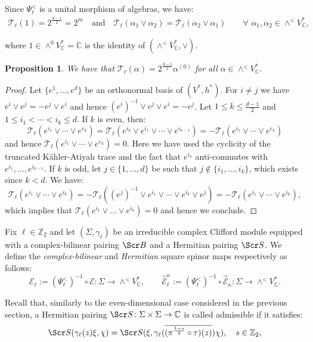 \documentclass[10pt,a4paper,twoside,reqno]{amsart}
\theoremstyle{plain}
\newtheorem{prop}[thm]{Proposition}
\theoremstyle{definition}
\theoremstyle{remark}
\def\C{\mathbb{C}}
\def\scB{\Scr B}
\def\scS{\Scr S}
\def\cE{\mathcal{E}}
\def\hcE{\widehat{\mathcal{E}}}
\begin{document}
\noindent 
Since $\Psi^<_\ell$ is a unital morphism of algebras, we have: 
\begin{eqnarray*}
\mathcal{T}_\ell(1) = 2^{\frac{d-1}{2}}  = 2^m \quad \text{and}\quad\mathcal{T}_\ell(\alpha_1\vee\alpha_2)=\mathcal{T}_\ell(\alpha_2\vee\alpha_1)\qquad\forall \,\, \alpha_1,\alpha_2\in\wedge^<V^*_\C,
\end{eqnarray*}

\noindent
where $1\in\wedge^0V^*_\C=\C$ is the identity of $(\wedge^<V^*_\C,\vee)$.
\begin{prop}
We have that $\mathcal{T}_\ell(\alpha)=2^{\frac{d-1}{2}}\alpha^{(0)}$ for all $\alpha\in\wedge^<V^*_\C$.
\end{prop}

\begin{proof}
    Let $\{e^1,\ldots,e^d\}$ be an orthonormal basis of $(V^*,h^*)$. For $i\neq j$ we have $e^i\vee e^j=-e^j\vee e^i$ and hence $(e^i)^{-1}\vee e^j\vee e^i=-e^j$. Let $1\leq k\leq\frac{d-1}{2}$ and $1\leq i_1<\cdots<i_k\leq d$. If $k$ is even, then: $$\mathcal{T}_\ell(e^{i_1}\vee\cdots\vee e^{e_k})=\mathcal{T}_\ell(e^{i_k}\vee e^{i_1}\vee\cdots\vee e^{i_{k-1}})=-\mathcal{T}_\ell(e^{i_1}\vee\cdots\vee e^{e_k})$$ and hence $\mathcal{T}_\ell(e^{i_1}\vee\cdots\vee e^{e_k})=0$. Here we have used the cyclicity of the truncated Kähler-Atiyah trace and the fact that $e^{i_k}$ anti-commutes with $e^{i_1},\ldots,e^{i_{k-1}}$. If $k$ is odd, let $j\in\{1,\ldots,d\}$ be such that $j\not\in\{i_1,\ldots,i_k\}$, which exists since $k<d$. We have: $$\mathcal{T}_\ell(e^{i_1}\vee\cdots\vee e^{i_k})=-\mathcal{T}_\ell((e^j)^{-1}\vee e^{i_1}\vee\cdots\vee e^{i_k}\vee e^j)=-\mathcal{T}_\ell(e^{i_1}\vee\cdots\vee e^{i_k}),$$ which implies that $\mathcal{T}_\ell(e^{i_1}\vee\dots\vee e^{i_k})=0$ and hence we conclude.
\end{proof}

Fix $\ell\in\mathbb{Z}_2$ and let $(\Sigma,\gamma_\ell)$ be an irreducible complex Clifford module equipped with a complex-bilinear pairing $\scB$ and a Hermitian pairing $\scS$. We define the \emph{complex-bilinear} and \emph{Hermitian} square spinor maps respectively as follows:
\begin{equation*}
\cE_\ell:=(\Psi_\ell^<)^{-1}\circ\cE\colon\Sigma\to\wedge^<V^*_\C,\qquad\hcE^\kappa_\ell:=(\Psi_\ell^<)^{-1}\circ\hcE_\kappa\colon\Sigma\to\wedge^<V^*_\C.
\end{equation*}

\noindent
Recall that, similarly to the even-dimensional case considered in the previous section, a Hermitian pairing $\scS\colon\Sigma\times\Sigma\to\C$ is called admissible if it satisfies:
\begin{equation}
\label{eq:adjoint_type}
\scS(\gamma_\ell(z)\xi,\chi)=\scS(\xi,\gamma_\ell(\overline{(\pi^{\frac{1-s}{2}}\circ\tau)(z)})\chi),\quad s\in\mathbb{Z}_2,
\end{equation} 
\end{document}
